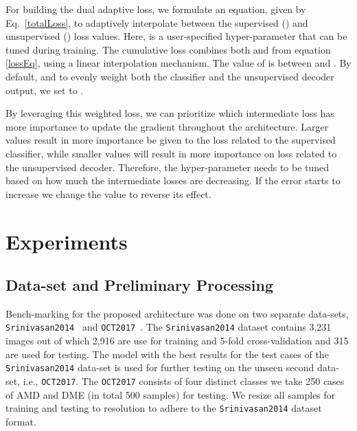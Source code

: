 \documentclass{article}
\begin{document}
For building the dual adaptive loss, we formulate an equation, given by Eq.~\eqref{totalLoss}, to adaptively interpolate between the supervised () and unsupervised () loss values. Here,  is a user-specified hyper-parameter that can be tuned during training. The cumulative loss  combines both  and  from equation \eqref{lossEq}, using a linear interpolation mechanism. The value of  is between  and  . By default, and to evenly weight both the classifier and the unsupervised decoder output, we set  to . 

\vspace{-.1in}


By leveraging this weighted loss, we can prioritize which intermediate loss has more importance to update the gradient throughout the architecture. Larger  values result in more importance be given to the  loss related to the supervised classifier, while smaller  values will result in more importance on  loss related to the unsupervised decoder. Therefore, the hyper-parameter  needs to be tuned based on how much the intermediate losses are decreasing. If the error starts to increase we change the  value to reverse its effect. 
\vspace{-.1in}
\section{Experiments}
\subsection{Data-set and Preliminary Processing}
Bench-marking for the proposed architecture was done on two separate data-sets, \texttt{Srinivasan2014}~\cite{sri2014} and \texttt{OCT2017}~\cite{kermany2018identifying}. The \texttt{Srinivasan2014} dataset contains 3,231 images out of which 2,916 are use for training and 5-fold cross-validation and 315 are used for testing. The model with the best results for the test cases of the \texttt{Srinivasan2014} data-set is used for further testing on the unseen second data-set, i.e., \texttt{OCT2017}. The \texttt{OCT2017} consists of four distinct classes we take 250 cases of AMD and DME (in total 500 samples) for testing. We resize all samples for training and testing to  resolution to adhere to the \texttt{Srinivasan2014} dataset format.
\end{document}
